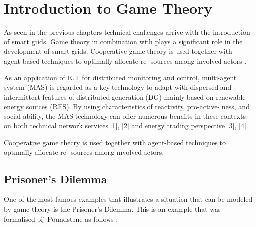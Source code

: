 \section{Introduction to Game Theory}

As seen in the previous chapters technical challenges arrive with the introduction of smart grids. Game theory in combination with plays a significant role in the development of smart grids. Cooperative game theory is used together with agent-based techniques to optimally allocate re- sources among involved actors \cite{nguyen2013game}. 


As an application of ICT for distributed monitoring and control, multi-agent system (MAS) is regarded as a key technology to adapt with dispersed and intermittent features of distributed generation (DG) mainly based on renewable energy sources (RES). By using characteristics of reactivity, pro-active- ness, and social ability, the MAS technology can offer numerous benefits in these contexts on both technical network services [1], [2] and energy trading perspective [3], [4].

Cooperative game theory is used together with agent-based techniques to optimally allocate re- sources among involved actors.

\subsection{Prisoner's Dilemma}
One of the most famous examples that illustrates a situation that can be modeled by game theory is the Prisoner's Dilemma. This is an example that was formalised bij Poundstone as follows \cite{poundstone}: 

